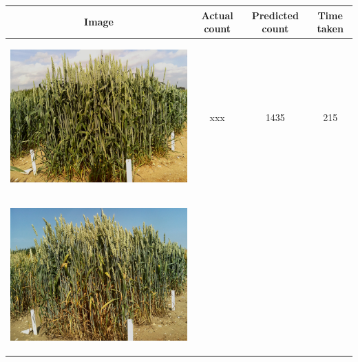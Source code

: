 \begin{table}[hp!]
  \centering
  \begin{tabular}{ | c | c | c | c |}
    \hline
    Image & Actual count & Predicted count & Time taken \\ \hline
    \begin{minipage}{.3\textwidth}
      \begin{center}
		\includegraphics[width=\linewidth]{Images/001}
      \end{center}
    \end{minipage}
    &
      xxx
    & 
      1435
    & 
      215
    \\ \hline
    \begin{minipage}{.3\textwidth}
      \begin{center}
		\includegraphics[width=\linewidth]{Images/002}

\end{center}
\end{minipage}
\end{tabular}
\end{table}
